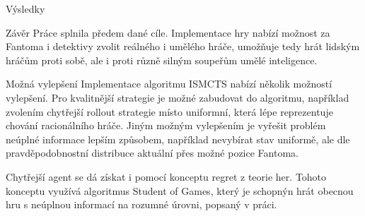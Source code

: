 \documentclass[portrait,a0paper,fontscale=0.25]{baposter}
\begin{document}
\begin{poster}
\begin{posterbox}[column=1, name=result1]{Výsledky}
\end{posterbox}

\begin{posterbox}[column=1, name=result2, below=result1]{Závěr}
Práce splnila předem dané cíle. Implementace hry nabízí možnost za Fantoma i detektivy zvolit reálného i umělého hráče, umožňuje tedy hrát lidským hráčům proti sobě, ale i proti různě silným soupeřům umělé inteligence.
\end{posterbox}

\begin{posterbox}[column=1, name=result3, below=result2]{Možná vylepšení}
Implementace algoritmu ISMCTS nabízí několik možností vylepšení. Pro kvalitnější strategie je možné zabudovat do algoritmu, například zvolením chytřejší rollout strategie místo uniformní, která lépe reprezentuje chování racionálního hráče. Jiným možným vylepšením je vyřešit problém neúplné informace lepším způsobem, například nevybírat stav uniformě, ale dle pravděpodobnostní distribuce aktuální přes možné pozice Fantoma.  
  
Chytřejší agent se dá získat i pomocí konceptu regret z teorie her. Tohoto konceptu využívá algoritmus Student of Games, který je schopnýn hrát obecnou hru s neúplnou informací na rozumné úrovni, popsaný v práci.
\end{posterbox}



\end{poster}
\end{document}
